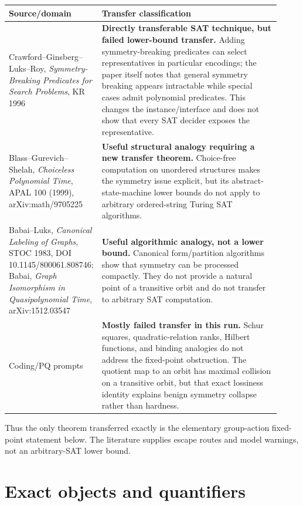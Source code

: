 \documentclass[11pt]{article}
\begin{document}
\begin{center}
\begin{tabular}{p{0.23\linewidth}p{0.69\linewidth}}
\toprule
Source/domain & Transfer classification \\
\midrule
Crawford--Ginsberg--Luks--Roy, \emph{Symmetry-Breaking Predicates for Search Problems}, KR 1996 & \textbf{Directly transferable SAT technique, but failed lower-bound transfer.}  Adding symmetry-breaking predicates can select representatives in particular encodings; the paper itself notes that general symmetry breaking appears intractable while special cases admit polynomial predicates.  This changes the instance/interface and does not show that every SAT decider exposes the representative. \\
Blass--Gurevich--Shelah, \emph{Choiceless Polynomial Time}, APAL 100 (1999), arXiv:math/9705225 & \textbf{Useful structural analogy requiring a new transfer theorem.}  Choice-free computation on unordered structures makes the symmetry issue explicit, but its abstract-state-machine lower bounds do not apply to arbitrary ordered-string Turing SAT algorithms. \\
Babai--Luks, \emph{Canonical Labeling of Graphs}, STOC 1983, DOI 10.1145/800061.808746; Babai, \emph{Graph Isomorphism in Quasipolynomial Time}, arXiv:1512.03547 & \textbf{Useful algorithmic analogy, not a lower bound.}  Canonical form/partition algorithms show that symmetry can be processed compactly.  They do not provide a natural point of a transitive orbit and do not transfer to arbitrary SAT computation. \\
Coding/PQ prompts & \textbf{Mostly failed transfer in this run.}  Schur squares, quadratic-relation ranks, Hilbert functions, and binding analogies do not address the fixed-point obstruction.  The quotient map to an orbit has maximal collision on a transitive orbit, but that exact lossiness identity explains benign symmetry collapse rather than hardness. \\
\bottomrule
\end{tabular}
\end{center}

Thus the only theorem transferred exactly is the elementary group-action fixed-point statement below.  The literature supplies escape routes and model warnings, not an arbitrary-SAT lower bound.

\section{Exact objects and quantifiers}
\end{document}
